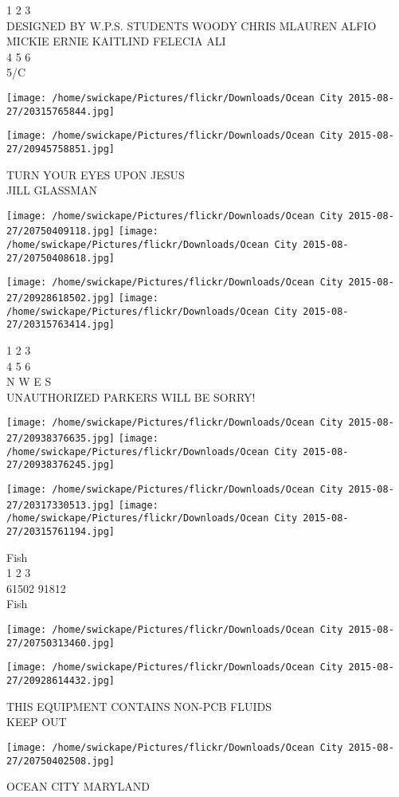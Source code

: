 \documentclass[10pt,letterpaper]{article}
\begin{document}
1 2 3\\
DESIGNED BY W.P.S. STUDENTS WOODY CHRIS MLAUREN ALFIO MICKIE ERNIE KAITLIND FELECIA ALI\\
4 5 6\\
5/C
\pagebreak

\texttt{[image: /home/swickape/Pictures/flickr/Downloads/Ocean City 2015-08-27/20315765844.jpg]}

\vspace{0.25in}
\texttt{[image: /home/swickape/Pictures/flickr/Downloads/Ocean City 2015-08-27/20945758851.jpg]}

TURN YOUR EYES UPON JESUS\\
JILL GLASSMAN
\pagebreak

\texttt{[image: /home/swickape/Pictures/flickr/Downloads/Ocean City 2015-08-27/20750409118.jpg]}
\texttt{[image: /home/swickape/Pictures/flickr/Downloads/Ocean City 2015-08-27/20750408618.jpg]}

\texttt{[image: /home/swickape/Pictures/flickr/Downloads/Ocean City 2015-08-27/20928618502.jpg]}
\texttt{[image: /home/swickape/Pictures/flickr/Downloads/Ocean City 2015-08-27/20315763414.jpg]}

1 2 3\\
4 5 6\\
N W E S\\
UNAUTHORIZED PARKERS WILL BE SORRY!
\pagebreak

\texttt{[image: /home/swickape/Pictures/flickr/Downloads/Ocean City 2015-08-27/20938376635.jpg]}
\texttt{[image: /home/swickape/Pictures/flickr/Downloads/Ocean City 2015-08-27/20938376245.jpg]}

\texttt{[image: /home/swickape/Pictures/flickr/Downloads/Ocean City 2015-08-27/20317330513.jpg]}
\texttt{[image: /home/swickape/Pictures/flickr/Downloads/Ocean City 2015-08-27/20315761194.jpg]}

Fish\\
1 2 3\\
61502 91812\\
Fish
\pagebreak

\texttt{[image: /home/swickape/Pictures/flickr/Downloads/Ocean City 2015-08-27/20750313460.jpg]}

\vspace{0.25in}
\texttt{[image: /home/swickape/Pictures/flickr/Downloads/Ocean City 2015-08-27/20928614432.jpg]}

THIS EQUIPMENT CONTAINS NON{-}PCB FLUIDS\\
KEEP OUT
\pagebreak

\texttt{[image: /home/swickape/Pictures/flickr/Downloads/Ocean City 2015-08-27/20750402508.jpg]}

OCEAN CITY MARYLAND
\pagebreak
\end{document}

